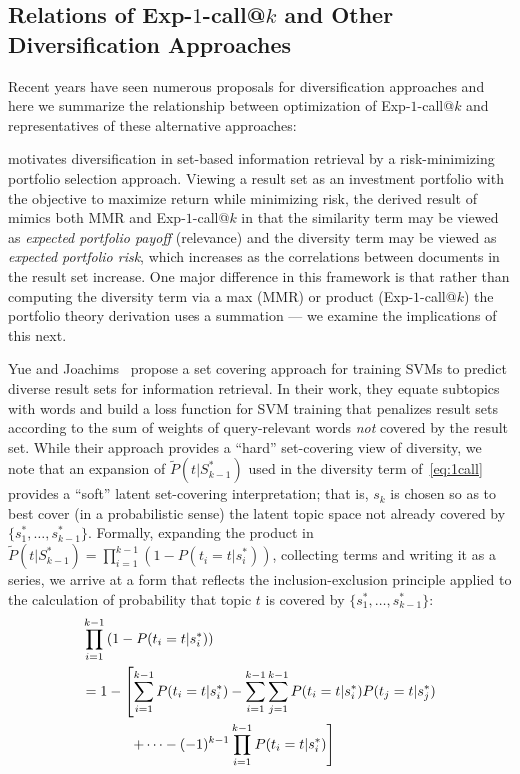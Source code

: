 \subsection{Relations of Exp-$1$-call@$k$ and Other Diversification Approaches}

Recent years have seen numerous proposals for diversification
approaches and here we summarize the relationship between optimization
of Exp-$1$-call@$k$ and representatives of these alternative
approaches:

 \cite{wang09PortfolioTheory} motivates
diversification in set-based information retrieval by a
risk-minimizing portfolio selection approach.  Viewing a result set as
an investment portfolio with the objective to maximize return while
minimizing risk, the derived result of~\cite{wang09PortfolioTheory}
mimics both MMR and Exp-$1$-call@$k$ in that the similarity term may
be viewed as \emph{expected portfolio payoff} (relevance) and the
diversity term may be viewed as \emph{expected portfolio risk}, which
increases as the correlations between documents in the result set
increase.  One major difference in this framework is that rather than
computing the diversity term via a max (MMR) or product
(Exp-$1$-call@$k$) the portfolio theory derivation uses a summation
--- we examine the implications of this next.

Yue and Joachims~\cite{yue081224Predicting} propose a set covering
approach for training SVMs to predict diverse result sets for
information retrieval.  In their work, they equate subtopics with
words and build a loss function for SVM training that penalizes
result sets according to the sum of weights of query-relevant words
\emph{not} covered by the result set.  While their approach provides a
``hard'' set-covering view of diversity, we note that an expansion of
$\tilde{P}(t | S_{k-1}^*)$ used in the diversity term
of~\eqref{eq:1call} provides a ``soft'' latent set-covering
interpretation; that is, $s_k$ is chosen so as to best cover (in a
probabilistic sense) the latent topic space not already covered by $\{
s_1^*,\ldots,s_{k-1}^* \}$.  Formally, expanding the product in
$\tilde{P}(t | S_{k-1}^*) = \prod_{i=1}^{k-1} \left(1 -
P(t_{i}=t|s_{i}^{*})\right)$, collecting terms and writing it as a
series, we arrive at a form that reflects the inclusion-exclusion
principle applied to the calculation of probability that topic $t$ is
covered by $\{ s_1^*,\ldots,s_{k-1}^* \}$:
\begin{align}
& \prod_{i=1}^{k-1} \left(1 - P(t_{i}=t|s_{i}^{*})\right) \nonumber \\
& = 1 - \left[ \sum_{i=1}^{k-1} P(t_{i}= t|s_{i}^{*}) - \sum_{i=1}^{k-1}\sum_{j=1}^{k-1}P(t_{i}= t|s_{i}^{*})P(t_{j}= t|s_{j}^{*}) \right. \nonumber \\
& \hspace{12mm} \left. + \dots - (-1)^{k-1}\prod_{i=1}^{k-1}P(t_{i}=t|s_{i}^{*})\right] \label{eq:setcover}
\end{align}

